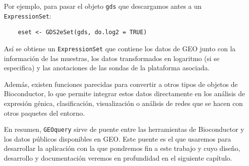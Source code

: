 Por ejemplo, para pasar el objeto \texttt{gds} que descargamos antes a un \texttt{ExpressionSet}:

\begin{verbatim}
    eset <- GDS2eSet(gds, do.log2 = TRUE)
\end{verbatim}

Así se obtiene un \texttt{ExpressionSet} que contiene los datos de GEO junto con la información de las muestras, los datos transformados en logaritmo (si se especifica) 
y las anotaciones de las sondas de la plataforma asociada. \newline

Además, existen funciones parecidas para convertir a otros tipos de objetos de Bioconductor, lo que permite integrar estos datos directamente en los análisis de expresión 
génica, clasificación, visualización o análisis de redes que se hacen con otros paquetes del entorno. \newline

En resumen, \texttt{GEOquery} sirve de puente entre las herramientas de Bioconductor y los datos públicos disponibles en GEO. Este puente es el que usaremos para desarrollar
la aplicación con la que pondremos fin a este trabajo y cuyo diseño, desarrollo y documentación veremos en profundidad en el siguiente capítulo. \newline